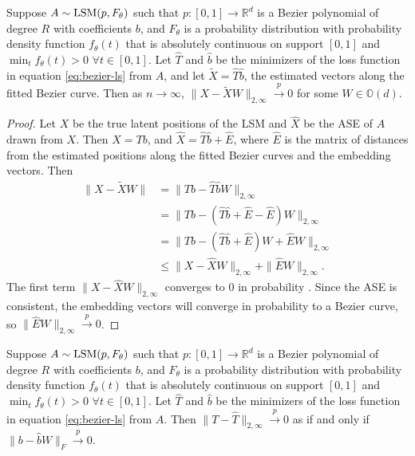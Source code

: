 \documentclass[12pt]{article}
\begin{document}
\begin{lemma}
\label{lem:bezier-consistency}
Suppose $A \sim \mathrm{LSM}(p, F_\theta)$ such that $p : [0, 1] \to \mathbb{R}^d$ is a Bezier polynomial of degree $R$ with coefficients $b$, and $F_\theta$ is a probability distribution with probability density function $f_\theta(t)$ that is absolutely continuous on support $[0, 1]$ and $\min_t f_\theta(t) > 0$ $\forall t \in [0, 1]$. 
Let $\hat{T}$ and $\hat{b}$ be the minimizers of the loss function in equation \ref{eq:bezier-ls} from $A$, and let $\tilde{X} = \hat{T} \hat{b}$, the estimated vectors along the fitted Bezier curve. 
Then as $n \to \infty$, $\|X - \tilde{X} W\|_{2,\infty} \stackrel{p}{\to} 0$ for some $W \in \mathbb{O}(d)$.
\end{lemma}

\begin{proof}
Let $X$ be the true latent positions of the LSM and $\hat{X}$ be the ASE of $A$ drawn from $X$. 
Then $X = T b$, and $\hat{X} = \hat{T} \hat{b} + \hat{E}$, where $\hat{E}$ is the matrix of distances from the estimated positions along the fitted Bezier curves and the embedding vectors. 
Then
$$
\begin{aligned}
\|X - \tilde{X} W\| & = \|T b - \hat{T} \hat{b} W\|_{2,\infty} \\
& = \|T b - (\hat{T} \hat{b} + \hat{E} - \hat{E}) W \|_{2,\infty} \\
& = \|T b - (\hat{T} \hat{b} + \hat{E}) W + \hat{E} W\|_{2,\infty} \\
& \leq \|X - \hat{X} W\|_{2,\infty} + \|\hat{E} W\|_{2,\infty}.
\end{aligned}
$$
The first term $\|X - \hat{X} W\|_{2,\infty}$ converges to $0$ in probability \citep{lyzinski2014}. 
Since the ASE is consistent, the embedding vectors will converge in probability to a Bezier curve, so $\|\hat{E} W\|_{2,\infty} \stackrel{p}{\to} 0$. 
\end{proof}

\begin{lemma}
Suppose $A \sim \mathrm{LSM}(p, F_\theta)$ such that $p : [0, 1] \to \mathbb{R}^d$ is a Bezier polynomial of degree $R$ with coefficients $b$, and $F_\theta$ is a probability distribution with probability density function $f_\theta(t)$ that is absolutely continuous on support $[0, 1]$ and $\min_t f_\theta(t) > 0$ $\forall t \in [0, 1]$. 
Let $\hat{T}$ and $\hat{b}$ be the minimizers of the loss function in equation \ref{eq:bezier-ls} from $A$. 
Then $\|T - \hat{T}\|_{2, \infty} \stackrel{p}{\to} 0$ as if and only if $\|b - \hat{b} W\|_F \stackrel{p}{\to} 0$. 
\end{lemma}
\end{document}
